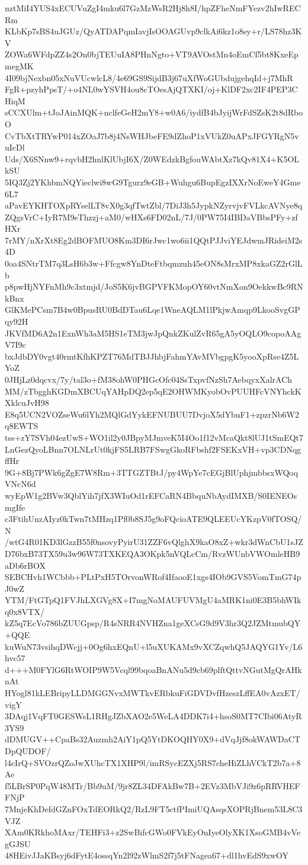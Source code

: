 nztMiI4YUS4xECUVuZgI4mku6l7GzMzWsR2Hj8h8I/hpZFheNmFYezv2hIwRECRm
KLbKp7sBS4uJGUz/QyATDAPqmIavjIsOOAGUvp9clkAi6kz1o8sy+r/LS78hz3KV
ZOWa6WFdpZZ4s2On0bjTEUuIA8PHnNgto+VT9AVOstMn4oEmCf5bt8KxeEpmegMK
4I09bjNexbn05xNuVUcwlcL8/4e69GS9SijdB3j67uXfWoGUbdujgehqId+j7MhR
FgR+pzyhPpsT/+o4NL0wYSVH4ou8cTOesAjQTXKI/oj+KlDF2xc2IF4PEP3CHiqM
sCCXUlm+tJoJAinMQK+nclfeGeH2mY8+w0A6/iydfB4bJyijWrFdSZsK2t8dRboO
CvTbXtTRYwP014xZOaJ7b8j4NsWHJbeFE9dZhoP1xVUkZ0uAPxJFGYRgN5vuIcDl
Uds/X6SNnw9+rqvbH2hnlKlUbjI6X/Z0WEdzkBgfouWAbtXz7kQv81X4+K5OLkSU
5IQ3Zj2YKhbmNQYieclwi8wG9Tgurz9eGB+Wuhgu6BupEgzIXXrNoEweY4Gme6L7
aPavEYKHTOXpRYselLT8vX0g3qfTwtZbl/7DiJ3h5JypkNZyrvjvFVLkcAVNye8q
ZQgsVrC+IyR7M9eThzzj+aM0/wHXs6FD02nL/7J/0PW75I4IBDaVBbsPFy+zfHXr
7rMY/nXrXt8Eg2dBOFMUO8Km3DI6rJwc1wo6ii1QQtPJJviYEJdwmJRideiM2s4D
0oa4SNtrTM7q3LsH6b3w+Ffcgw8YnDteFtbqmzuh45eON8sMrxMP8xkaGZ2rGlLb
p8pwHjNYFnMh9c3xtmjd/JoS5K6jvBGPVFKMopOY60vtNmXon9OekkwBc9RNkBnx
GlKMePCsm7B4w0BpusRU0BdDTau6Lqe1WneAQLM1lPkjwAmqp9LkooSvgGPqy92H
JKVfMD6A2n1ExnWh3aM5HS1eTM3jwJpQnkZKulZvR65gA5yOQLO9copoAAgV7I9c
bxJdbDY0vgt40rmtKfhKPZT76MdTBJJhbjFahmYAvMVbgpgK5yooXpRse4Z5LYoZ
0JHjLz0dqcvx/7y/tal3o+fM38ohW0PHGcOfc04SsTxpvfNzSh7AebqyxXalrACh
MM/zTbgghKGDmXBCUqYAHpDQ2ep5qE2OHWMKyobOvPUUHFcVNYhckKXklcuJvH98
E8q5UCN2VOZseWu6lYh2MQlGdYykEFNUBUU7DvjoX5dYbuF1+zpzrNb6W2q8EWTS
tss+zY7SVh04ezUwS+WO1il2y0JBpyMJmveK5I4Oo1f12vMcaQkt8lUJ1tSmEQt7
LnGezQyoLBnn7OLNLrUt0kjFS5LRB7FSwgGkoRFbshf2FSEKxVH+vp3CDNqgffHr
9G+8Bj7PWk6gZgE7W8Rm+3TTGZTBtJ/py4WpYe7cEGjBlUphjmbbsxWQoqVNcN6d
wyEpW1g2BVw3QblYih7jfX3WIuOd1rEFCaRN4BbquNbAydIMXB/S0IENEOsmgIfe
c3FtihUnzAIyz0kTwn7tMHzq1Pf0b8SJ5g9oFQcioATE9QLEEUcYKzpV0fTOSQ/N
/wtG4R01KD3lGzzB55f0nsovyPyirU31ZZF6vQlghX9kaO8xZ+wkr3dWnCbU1sJZ
D76bxB73TX59u3w96W73TXKEQA3OKpk5nVQLcCm/RvzWUnbVWOmleHB9aDb6rBOX
SEBCHvh1WCbbb+PLtPxH5TOrvonWRof4IfaooE1xgs4IOb9GVS5VomTmG74pJ0wZ
YTM/FtGTpQ1FVJhLXGVg8X+I7mgNoMAUFUVMgU4aMRK1ni0E3B5bhWIkq0x8VTX/
kZ5q7EcVo786bZUUGpsp/R4sNRR4NVHZna1geXCsG9d9V3hr3Q2JZMtmubQY+QQE
kuWuN73vsihqDWcjj+0Og6hxEQnU+l5uXUKAMx9vXCZqwhQ5JAQYG1Yv/L6hvc57
d+++M0FYlG6RtWOIP9W5Vcql99bqoaBnANu5d9cb69plftQttvNGutMgQrAHknAt
HYogl81kLEBripyLLDMGGNvxMWTkvERbkuFiGDVDvfHzeszLffEA0vAzxET/vigY
3DAqj1VqFT0GESWsL1RHgJZbXAO2e5WeLA4DDK7i4+hsoS0MT7CIbi06AtyR3YS9
dDMUGV++CpaBs32Auzmh2AiY1pQ5YtDKOQHY0X9+dVqJjf8okWAWDaCTDpQUDOF/
l4cIrQ+SVOzrQZoJwXUhcTX1XHP9l/imRSycEZXj5RS7cheHiZLhVCkT2b7a+8Ae
f5LBrSP0PqW48MTr/Bb9uM/9jr8ZL34DFAkBw7B+2EVz3MbVJi9z6pRRVHEFFNjP
7MnjeKhDefdGZnFOxTdEORkQ2/RzL9FT5ctfPImiUQAsqsXOPRjBnem53L8C3VJZ
XAm0KRkhoMAxr/TEHFi3+z2SwBifcGWo0FVkEyOnIyeOlyXK1XsoGMB4vVegGJSU
48HEivJJaKBsyj6dFytE4ossqYn2l92zWlmS2f7j5tFNagea67+dl1hvEdS9xwOY
